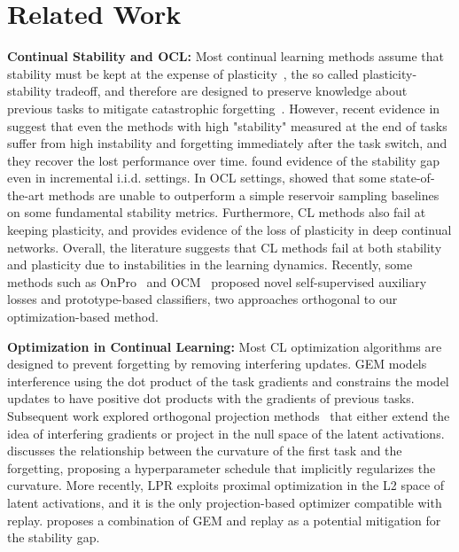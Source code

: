 \section{Related Work}
\textbf{Continual Stability and OCL:} Most continual learning methods assume that stability must be kept at the expense of plasticity~\cite{DBLP:journals/pami/LangeAMPJLST22,DBLP:journals/pami/MasanaLTMBW23}, the so called plasticity-stability tradeoff, and therefore are designed to preserve knowledge about previous tasks to mitigate catastrophic forgetting~\cite{french1999catastrophic}. However, recent evidence in \cite{DBLP:conf/iclr/LangeVT23,DBLP:conf/iclr/CacciaAATPB22} suggest that even the methods with high "stability" measured at the end of tasks suffer from high instability and forgetting immediately after the task switch, and they recover the lost performance over time. \cite{DBLP:journals/corr/abs-2406-05114} found evidence of the stability gap even in incremental i.i.d. settings. In OCL settings, \cite{DBLP:conf/iccvw/Soutif-Cormerais23} showed that some state-of-the-art methods are unable to outperform a simple reservoir sampling baselines on some fundamental stability metrics. 
Furthermore, CL methods also fail at keeping plasticity, and \cite{DBLP:journals/nature/DohareHLRMS24} provides evidence of the loss of plasticity in deep continual networks. Overall, the literature suggests that CL methods fail at both stability and plasticity due to instabilities in the learning dynamics. Recently, some methods such as OnPro~\cite{wei2023online} and OCM~\cite{guo2022online} proposed novel self-supervised auxiliary losses and prototype-based classifiers, two approaches orthogonal to our optimization-based method.

\textbf{Optimization in Continual Learning:} Most CL optimization algorithms are designed to prevent forgetting by removing interfering updates. GEM \cite{DBLP:conf/nips/Lopez-PazR17,DBLP:conf/iclr/ChaudhryRRE19} models interference using the dot product of the task gradients and constrains the model updates to have positive dot products with the gradients of previous tasks. Subsequent work explored orthogonal projection methods~\cite{DBLP:conf/iclr/SahaG021,DBLP:conf/aistats/FarajtabarAML20} that either extend the idea of interfering gradients or project in the null space of the latent activations. \cite{DBLP:conf/nips/MirzadehFPG20} discusses the relationship between the curvature of the first task and the forgetting, proposing a hyperparameter schedule that implicitly regularizes the curvature. More recently, LPR\cite{yoo2024layerwise} exploits proximal optimization in the L2 space of latent activations, and it is the only projection-based optimizer compatible with replay. \cite{DBLP:journals/corr/abs-2311-04898} proposes a combination of GEM and replay as a potential mitigation for the stability gap.

